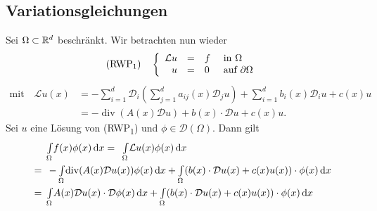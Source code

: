 \documentclass{cheat-sheet}
\newcommand{\bOmega}{\partial \Omega} %
\newcommand{\IntOmega}[2]{\AInt{\Omega}{#1}{#2}} %
\newcommand{\IntbOmega}[2]{\AInt{\bOmega}{#1}{#2}} %
\newcommand{\LL}{\mathcal{L}} %
\DeclareMathOperator{\dive}{div} %
\newcommand{\tss}[1]{\textsubscript{#1}} %
\newcommand{\DO}{\mathcal{D}} %
\newcommand{\Testfun}{\mathcal{D}} %
\begin{document}
\begin{samepage}

\subsection{Variationsgleichungen}

\begin{situation}
  Sei $\Omega \subset \mathbb{R}^d$ beschränkt.
  Wir betrachten nun wieder
  \[
    \text{(RWP\tss{1})} \quad
    \left\{ \begin{array}{rlll}
      \LL u &=& f &\text{ in $\Omega$} \\
      u &=& 0 &\text{ auf $\bOmega$}
    \end{array} \right.
  \]
  \vspace{-0.5cm}
  \begin{align*}
    \text{mit} \quad
    \LL u(x) & = - \sum_{i=1}^d \DO_i (\sum_{j=1}^d a_{ij}(x) \DO_j u) + \sum_{i=1}^d b_i(x) \DO_i u + c(x) u \\
    & = - \dive(A(x) \DO u) + b(x) \cdot \DO u + c(x) u.
  \end{align*}
  Sei $u$ eine Lösung von (RWP\tss{1}) und $\phi \in \Testfun(\Omega)$.
  Dann gilt
  \begin{align*}
    & \enspace \IntOmega{f(x) \phi(x)}{x}
    = \enspace \IntOmega{\LL u(x) \phi(x)}{x} \\
    = & \enspace - \IntOmega{\dive(A(x) \DO u(x)) \phi(x)}{x} + \IntOmega{\left( b(x) \cdot \DO u(x) + c(x) u(x) \right) \cdot \phi(x)}{x} \\
    = & \enspace \IntOmega{A(x) \DO u(x) \cdot \DO \phi(x)}{x} + \IntOmega{\left( b(x) \cdot \DO u(x) + c(x) u(x) \right) \cdot \phi(x)}{x}
  \end{align*}

  \iffalse
  Nebenrechnung:
  \begin{align*}
    & - \IntOmega{\sum_i \DO_i (\sum_j a_{ij}(x) \DO_j u(x) \phi(x))}{x} \\
    = & - \IntbOmega{\sum_i (\sum_j a_{ij}(x) \DO_j u(x)) \eta_i(x) \phi(x)}{s(x)} \\
    & + \IntOmega{\sum_i (\sum_j a_{ij}(x) \DO_j u(x)) \DO_i \phi(x)}{x} \\
    = & \IntOmega{A(x) \DO u(x) \cdot \DO \phi(x)}{x}
  \end{align*}
  \fi
\end{situation}

\end{samepage}
\end{document}
